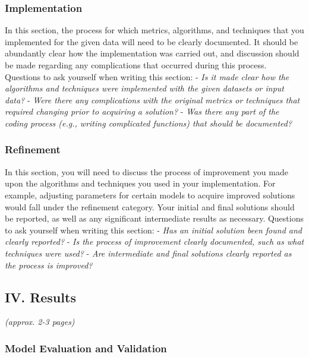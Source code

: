 \documentclass[
]{article}
\begin{document}
\hypertarget{implementation}{%
\subsubsection{Implementation}\label{implementation}}

In this section, the process for which metrics, algorithms, and
techniques that you implemented for the given data will need to be
clearly documented. It should be abundantly clear how the implementation
was carried out, and discussion should be made regarding any
complications that occurred during this process. Questions to ask
yourself when writing this section: - \emph{Is it made clear how the
algorithms and techniques were implemented with the given datasets or
input data?} - \emph{Were there any complications with the original
metrics or techniques that required changing prior to acquiring a
solution?} - \emph{Was there any part of the coding process (e.g.,
writing complicated functions) that should be documented?}

\hypertarget{refinement}{%
\subsubsection{Refinement}\label{refinement}}

In this section, you will need to discuss the process of improvement you
made upon the algorithms and techniques you used in your implementation.
For example, adjusting parameters for certain models to acquire improved
solutions would fall under the refinement category. Your initial and
final solutions should be reported, as well as any significant
intermediate results as necessary. Questions to ask yourself when
writing this section: - \emph{Has an initial solution been found and
clearly reported?} - \emph{Is the process of improvement clearly
documented, such as what techniques were used?} - \emph{Are intermediate
and final solutions clearly reported as the process is improved?}

\hypertarget{iv.-results}{%
\subsection{IV. Results}\label{iv.-results}}

\emph{(approx. 2-3 pages)}

\hypertarget{model-evaluation-and-validation}{%
\subsubsection{Model Evaluation and
Validation}\label{model-evaluation-and-validation}}
\end{document}
